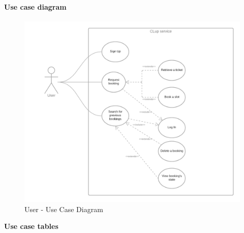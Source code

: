 \documentclass[table, 12pt]{article}
\begin{document}
\paragraph{Use case diagram}
\begin{figure}[H]
    \begin{center}
        \includegraphics[width=\textwidth]{assets/Use-Case-Diagrams/use_case_diagram_user.png}
        \caption{User - Use Case Diagram}
    \end{center}
\end{figure}



\textbf{Use case tables}
\end{document}
